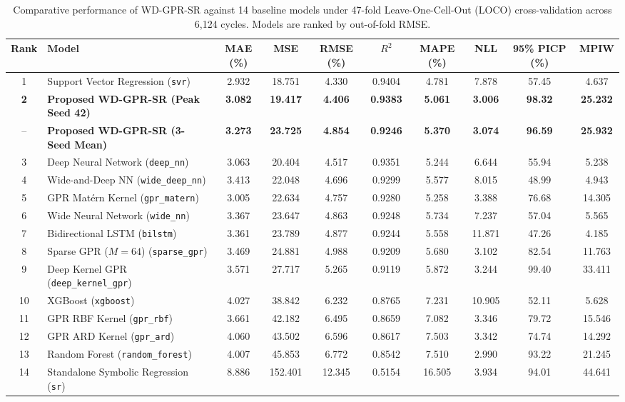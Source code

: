 \documentclass[a4paper,fleqn]{cas-sc}
\begin{document}
\begin{table}[t]
\centering
\caption{Comparative performance of WD-GPR-SR against 14 baseline models under 47-fold Leave-One-Cell-Out (LOCO) cross-validation across 6,124 cycles. Models are ranked by out-of-fold RMSE.}
\label{tab:baseline_comparison}
\footnotesize
\renewcommand{\arraystretch}{1.2}
\begin{tabular*}{\textwidth}{@{\extracolsep{\fill}}clcccccccc@{}}
\toprule
\textbf{Rank} & \textbf{Model} & \textbf{MAE (\%)} & \textbf{MSE} & \textbf{RMSE (\%)} & \textbf{$R^2$} & \textbf{MAPE (\%)} & \textbf{NLL} & \textbf{95\% PICP (\%)} & \textbf{MPIW} \\
\midrule
1 & Support Vector Regression (\texttt{svr}) & 2.932 & 18.751 & 4.330 & 0.9404 & 4.781 & 7.878 & 57.45 & 4.637 \\
\textbf{2} & \textbf{Proposed WD-GPR-SR (Peak Seed 42)} & \textbf{3.082} & \textbf{19.417} & \textbf{4.406} & \textbf{0.9383} & \textbf{5.061} & \textbf{3.006} & \textbf{98.32} & \textbf{25.232} \\
-- & \textbf{Proposed WD-GPR-SR (3-Seed Mean)} & \textbf{3.273} & \textbf{23.725} & \textbf{4.854} & \textbf{0.9246} & \textbf{5.370} & \textbf{3.074} & \textbf{96.59} & \textbf{25.932} \\
3 & Deep Neural Network (\texttt{deep\_nn}) & 3.063 & 20.404 & 4.517 & 0.9351 & 5.244 & 6.644 & 55.94 & 5.238 \\
4 & Wide-and-Deep NN (\texttt{wide\_deep\_nn}) & 3.413 & 22.048 & 4.696 & 0.9299 & 5.577 & 8.015 & 48.99 & 4.943 \\
5 & GPR Matérn Kernel (\texttt{gpr\_matern}) & 3.005 & 22.634 & 4.757 & 0.9280 & 5.258 & 3.388 & 76.68 & 14.305 \\
6 & Wide Neural Network (\texttt{wide\_nn}) & 3.367 & 23.647 & 4.863 & 0.9248 & 5.734 & 7.237 & 57.04 & 5.565 \\
7 & Bidirectional LSTM (\texttt{bilstm}) & 3.361 & 23.789 & 4.877 & 0.9244 & 5.558 & 11.871 & 47.26 & 4.185 \\
8 & Sparse GPR ($M=64$) (\texttt{sparse\_gpr}) & 3.469 & 24.881 & 4.988 & 0.9209 & 5.680 & 3.102 & 82.54 & 11.763 \\
9 & Deep Kernel GPR (\texttt{deep\_kernel\_gpr}) & 3.571 & 27.717 & 5.265 & 0.9119 & 5.872 & 3.244 & 99.40 & 33.411 \\
10 & XGBoost (\texttt{xgboost}) & 4.027 & 38.842 & 6.232 & 0.8765 & 7.231 & 10.905 & 52.11 & 5.628 \\
11 & GPR RBF Kernel (\texttt{gpr\_rbf}) & 3.661 & 42.182 & 6.495 & 0.8659 & 7.082 & 3.346 & 79.72 & 15.546 \\
12 & GPR ARD Kernel (\texttt{gpr\_ard}) & 4.060 & 43.502 & 6.596 & 0.8617 & 7.503 & 3.342 & 74.74 & 14.292 \\
13 & Random Forest (\texttt{random\_forest}) & 4.007 & 45.853 & 6.772 & 0.8542 & 7.510 & 2.990 & 93.22 & 21.245 \\
14 & Standalone Symbolic Regression (\texttt{sr}) & 8.886 & 152.401 & 12.345 & 0.5154 & 16.505 & 3.934 & 94.01 & 44.641 \\
\bottomrule
\end{tabular*}
\end{table}
\end{document}
